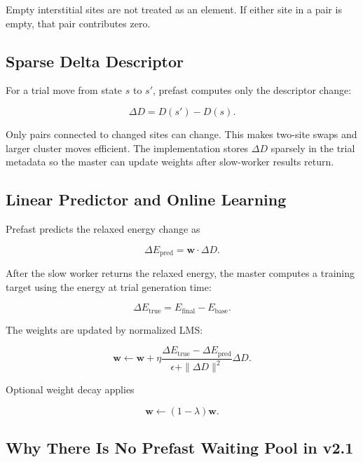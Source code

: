 \documentclass[11pt]{article}
\begin{document}
Empty interstitial sites are not treated as an element.
If either site in a pair is empty, that pair contributes zero.

\subsection{Sparse Delta Descriptor}

For a trial move from state $s$ to $s'$, prefast computes only the descriptor change:

\begin{equation}
  \Delta D = D(s') - D(s).
\end{equation}

Only pairs connected to changed sites can change.
This makes two-site swaps and larger cluster moves efficient.
The implementation stores $\Delta D$ sparsely in the trial metadata so the master can update weights after slow-worker results return.

\subsection{Linear Predictor and Online Learning}

Prefast predicts the relaxed energy change as

\begin{equation}
  \Delta E_{\mathrm{pred}} = \mathbf{w}\cdot\Delta D.
\end{equation}

After the slow worker returns the relaxed energy, the master computes a training target using the energy at trial generation time:

\begin{equation}
  \Delta E_{\mathrm{true}} = E_{\mathrm{final}} - E_{\mathrm{base}}.
\end{equation}

The weights are updated by normalized LMS:

\begin{equation}
  \mathbf{w}
  \leftarrow
  \mathbf{w}
  +
  \eta
  \frac{\Delta E_{\mathrm{true}}-\Delta E_{\mathrm{pred}}}
       {\epsilon + \|\Delta D\|^2}
  \Delta D.
\end{equation}

Optional weight decay applies

\begin{equation}
  \mathbf{w} \leftarrow (1-\lambda)\mathbf{w}.
\end{equation}

\subsection{Why There Is No Prefast Waiting Pool in v2.1}
\end{document}
